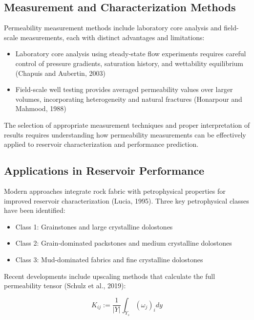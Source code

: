 \documentclass[journal]{IEEEtran}
\begin{document}
\subsection{Measurement and Characterization Methods}

Permeability measurement methods include laboratory core analysis and field-scale measurements, each with distinct advantages and limitations:

\begin{itemize}
    \item Laboratory core analysis using steady-state flow experiments requires careful control of pressure gradients, saturation history, and wettability equilibrium (Chapuis and Aubertin, 2003\cite{chapuis_use_2003})
    \item Field-scale well testing provides averaged permeability values over larger volumes, incorporating heterogeneity and natural fractures (Honarpour and Mahmood, 1988\cite{honarpour_relative-permeability_1988})
\end{itemize}

The selection of appropriate measurement techniques and proper interpretation of results requires understanding how permeability measurements can be effectively applied to reservoir characterization and performance prediction.

\subsection{Applications in Reservoir Performance}

Modern approaches integrate rock fabric with petrophysical properties for improved reservoir characterization (Lucia, 1995\cite{f_jerry_lucia_2_rock-fabricpetrophysical_1995}). Three key petrophysical classes have been identified:

\begin{itemize}
    \item Class 1: Grainstones and large crystalline dolostones
    \item Class 2: Grain-dominated packstones and medium crystalline dolostones
    \item Class 3: Mud-dominated fabrics and fine crystalline dolostones
\end{itemize}

Recent developments include upscaling methods that calculate the full permeability tensor (Schulz et al., 2019\cite{schulz_beyond_2019}):

\begin{equation}
K_{ij} := \frac{1}{|Y|}\int_{Y_s}(\omega_j)_i dy
\end{equation}
\end{document}
